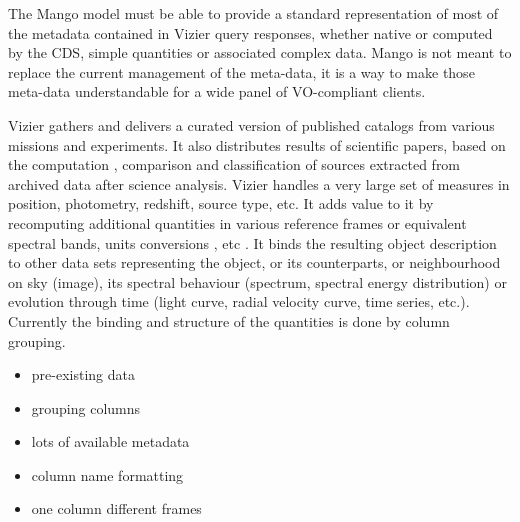 \documentclass[11pt,a4paper]{ivoa}
\begin{document}
The Mango model must be able to provide a standard representation of most of the metadata contained in Vizier query responses, whether native or computed  by the CDS, simple quantities or associated complex data.
Mango is not meant to replace the current management of the meta-data, it is a way to make those meta-data understandable for a wide panel of VO-compliant clients.

%
%
%
%


Vizier gathers and delivers a curated version of published catalogs from various missions and experiments.
It also distributes results of scientific papers, based on the computation , comparison and classification of sources extracted from archived data after science analysis.
Vizier handles a very large set of measures in position, photometry, redshift, source type, etc.
It adds value to it by recomputing additional quantities in various reference frames or equivalent spectral bands, units conversions , etc .
It binds the resulting object description to other data sets representing the object, or its counterparts, or neighbourhood on sky (image), its spectral behaviour (spectrum, spectral energy distribution) or evolution through time (light curve, radial velocity curve, time series, etc.).
Currently the binding and structure of the quantities is done by column grouping.
\begin{itemize}
    \item pre-existing data
    \item grouping columns
    \item lots of available metadata
    \item column name formatting
    \item one column different frames
\end{itemize}
\end{document}
